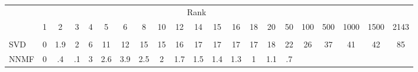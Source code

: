 \footnotesize
\begin{tabular}{@{\extracolsep{-5pt}} lcccccccccccccccccccc} 
    \toprule \multicolumn{20}{c}{{Rank}}\\
    \multicolumn{1}{c}{} & 1 & 2 & 3 & 4 & 5 & 6 & 8 & 10 & 12 & 14 & 15 & 16 & 18 & 20 & 50 & 100 & 500 & 1000 & 1500 & 2143\\\cline{2-21}\\
    SVD & 0 & 1.9 & 2 & 6 & 11 & 12 & 15 & 15 & 16 & 17 & 17 & 17 & 17 & 18 & 22 & 26 & 37 & 41 & 42 & 85\\
NNMF & 0 & .4 & .1 & 3 & 2.6 & 3.9 & 2.5 & 2 & 1.7 & 1.5 & 1.4 & 1.3 & 1 & 1.1 & .7\\
\bottomrule
\end{tabular}